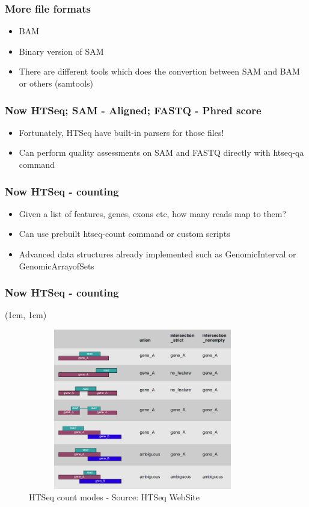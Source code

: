 \documentclass{beamer}
\begin{document}
\begin{frame}
\frametitle{More file formats}
    \begin{itemize}
        \item BAM
        \pause
        \item Binary version of SAM
        \pause
        \item There are different tools which does the convertion between SAM and BAM or others (samtools)
    \end{itemize} 
\end{frame}

\begin{frame}
    \frametitle{Now HTSeq; SAM - Aligned; FASTQ - Phred score}
    \begin{itemize}
        \item Fortunately, HTSeq have built-in parsers for those files!
        \pause
        \item Can perform quality assessments on SAM and FASTQ directly with htseq-qa command
    \end{itemize}
\end{frame}


\begin{frame}
    \frametitle{Now HTSeq - counting}
    \begin{itemize}
        \item Given a list of features, genes, exons etc, how many reads map to them?
        \pause
        \item Can use prebuilt htseq-count command or custom scripts
        \pause
        \item Advanced data structures already implemented such as GenomicInterval or GenomicArrayofSets
    \end{itemize} 
\end{frame}

\begin{frame}
    \frametitle{Now HTSeq - counting}
     {
        \begin{textblock*}{10cm}(1cm, 1cm)
            \begin{figure}
                \includegraphics[width=10cm,height=7cm,keepaspectratio]{img/countmodes.png}
                \caption{HTSeq count modes - Source: HTSeq WebSite}
            \end{figure}
        \end{textblock*}
    }
\end{frame}
\end{document}
